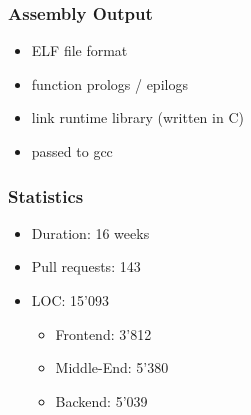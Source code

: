 \documentclass[navbaroff,en]{sdqbeamer}
\begin{document}
\begin{frame}
    \frametitle{Assembly Output}

    \begin{itemize}
        \item ELF file format
        \item function prologs / epilogs
        \item link runtime library (written in C)
        \item passed to gcc
    \end{itemize}

\end{frame}

\begin{frame}
	\frametitle{Statistics}

	\begin{itemize}
		\item Duration: 16 weeks
		\item Pull requests: 143
		\item LOC: 15'093
		\begin{itemize}
			\item Frontend: 3'812
			\item Middle-End: 5'380
			\item Backend: 5'039
		\end{itemize}
	\end{itemize}


\end{frame}


\begin{frame}
\end{frame}

\appendix
\beginbackup

\backupend
\end{document}
